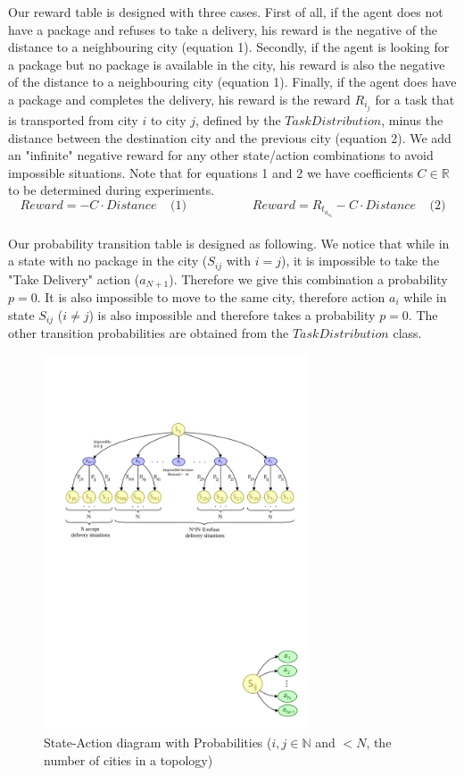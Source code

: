 \documentclass[11pt]{article}
\newcommand{\R}{\mathbb{R}}
\newcommand{\N}{\mathbb{N}}
\begin{document}
\indent Our reward table is designed with three cases. First of all, if the agent does not have a package and refuses to take a delivery, his reward is the negative of the distance to a neighbouring city (equation 1). Secondly, if the agent is looking for a package but no package is available in the city, his reward is also the negative of the distance to a neighbouring city (equation 1). Finally, if the agent does have a package and completes the delivery, his reward is the reward $R_i_j$ for a task that is transported from city $i$ to city $j$, defined by the $TaskDistribution$, minus the distance between the destination city and the previous city (equation 2). We add an "infinite" negative reward for any other state/action combinations to avoid impossible situations. Note that for equations 1 and 2 we have coefficients $C\in \R$ to be determined during experiments.
\[
    Reward = - C\cdot Distance \; \; \; \; \text{(1)} \; \; \; \; \; \; \; \; \; \; \; \; \; \; \; \; \; \; \; Reward = R_t_a_s_k - C\cdot Distance \; \; \; \;  \text{(2)}
\]
\\
\indent Our probability transition table is designed as following. We notice that while in a state with no package in the city ($S_{ij}$ with $i=j$), it is impossible to take the "Take Delivery" action ($a_{N+1}$). Therefore we give this combination a probability $p=0$. It is also impossible to move to the same city, therefore action $a_i$ while in state $S_{ij}$ ($i\neq j$) is also impossible and therefore takes a probability $p=0$. The other transition probabilities are obtained from the $TaskDistribution$ class.

\begin{figure}[h]
    \centering
    \includegraphics[width=0.7\textwidth, frame]{Fig1.pdf}
    \caption{State-Action diagram with Probabilities ($i, j \in \N$ and $<N$, the number of cities in a topology)}
    \label{fig:1}
\end{figure}
\end{document}
